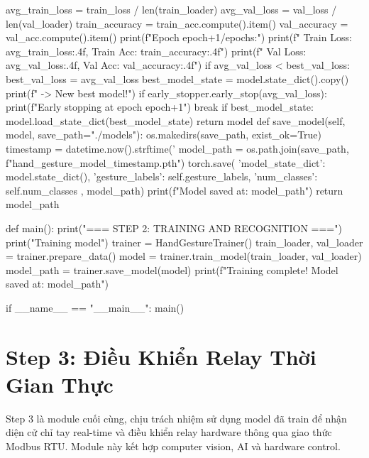 \begin{aivncodebox}
\begin{python}
            avg_train_loss = train_loss / len(train_loader)
            avg_val_loss = val_loss / len(val_loader)
            train_accuracy = train_acc.compute().item()
            val_accuracy = val_acc.compute().item()
            print(f"Epoch {epoch+1}/{epochs}:")
            print(f"  Train Loss: {avg_train_loss:.4f}, Train Acc: {train_accuracy:.4f}")
            print(f"  Val Loss: {avg_val_loss:.4f}, Val Acc: {val_accuracy:.4f}")
            if avg_val_loss < best_val_loss:
                best_val_loss = avg_val_loss
                best_model_state = model.state_dict().copy()
                print(f"  -> New best model!")
            if early_stopper.early_stop(avg_val_loss):
                print(f"Early stopping at epoch {epoch+1}")
                break
        if best_model_state:
            model.load_state_dict(best_model_state)
        return model
    def save_model(self, model, save_path="./models"):
        os.makedirs(save_path, exist_ok=True)
        timestamp = datetime.now().strftime('%
        model_path = os.path.join(save_path, f"hand_gesture_model_{timestamp}.pth")
        torch.save({
            'model_state_dict': model.state_dict(),
            'gesture_labels': self.gesture_labels,
            'num_classes': self.num_classes
        }, model_path)
        print(f"Model saved at: {model_path}")
        return model_path

def main():
    print("=== STEP 2: TRAINING AND RECOGNITION ===")
    print("Training model")
    trainer = HandGestureTrainer()
    train_loader, val_loader = trainer.prepare_data()
    model = trainer.train_model(train_loader, val_loader)
    model_path = trainer.save_model(model)
    print(f"Training complete! Model saved at: {model_path}")

if __name__ == "__main__":
    main()
\end{python}
\end{aivncodebox}


\section{Step 3: Điều Khiển Relay Thời Gian Thực}

Step 3 là module cuối cùng, chịu trách nhiệm sử dụng model đã train để nhận diện cử chỉ tay real-time và điều khiển relay hardware thông qua giao thức Modbus RTU. Module này kết hợp computer vision, AI và hardware control.

